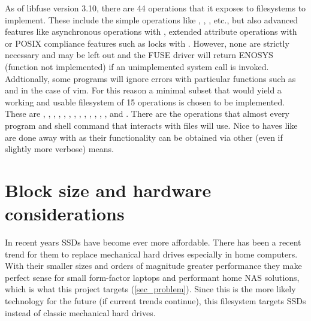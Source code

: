         As of libfuse version 3.10, there are 44 operations that it exposes to
        filesystems to implement. These include the simple operations like
        , , , etc., but also
        advanced features like asynchronous operations with ,
        extended attribute operations with  or POSIX
        compliance features such as locks with . However, none
        are strictly necessary and may be left out and the FUSE driver will
        return ENOSYS (function not implemented) if an unimplemented system
        call is invoked. Addtionally, some programs will ignore errors with
        particular functions such as  and  in
        the case of vim. For this reason a minimal subset that would yield a
        working and usable filesystem of 15 operations is chosen to be
        implemented. These are , ,
        , , ,
        , , , ,
        , , , ,
         and . There are the operations that
        almost every program and shell command that interacts with files will
        use. Nice to haves like  are done away with as their
        functionality can be obtained via other (even if slightly more verbose)
        means.

    \section{Block size and hardware considerations}
        \label{sec_block_size}

        In recent years SSDs have become ever more affordable. There has been a
        recent trend for them to replace mechanical hard drives
        \cite{ssd_sales} especially in home computers. With their smaller sizes
        and orders of magnitude greater performance they make perfect sense for
        small form-factor laptops and performant home NAS solutions, which is
        what this project targets (\ref{sec_problem}). Since this is the more
        likely technology for the future (if current trends continue), this
        filesystem targets SSDs instead of classic mechanical hard drives.


